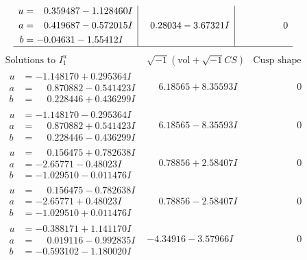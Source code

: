 \documentclass[1p]{elsarticle_modified}
\theoremstyle{definition}
\newcommand{\I}{\sqrt{-1}}
\begin{document}
$$\begin{array}{c|c|c}
\begin{aligned}
u &= \phantom{-}0.359487 - 1.128460 I \\
a &= \phantom{-}0.419687 - 0.572015 I \\
b &= -0.04631 - 1.55412 I\end{aligned}
 & \phantom{-}0.28034 - 3.67321 I & \phantom{-0.000000 } 0\\
 \hline 
 \end{array}$$\newpage$$\begin{array}{c|c|c}  
\text{Solutions to }I^u_{1}& \I (\text{vol} + \sqrt{-1}CS) & \text{Cusp shape}\\
 \hline 
\begin{aligned}
u &= -1.148170 + 0.295364 I \\
a &= \phantom{-}0.870882 - 0.541423 I \\
b &= \phantom{-}0.228446 + 0.436299 I\end{aligned}
 & \phantom{-}6.18565 + 8.35593 I & \phantom{-0.000000 } 0 \\ \hline\begin{aligned}
u &= -1.148170 - 0.295364 I \\
a &= \phantom{-}0.870882 + 0.541423 I \\
b &= \phantom{-}0.228446 - 0.436299 I\end{aligned}
 & \phantom{-}6.18565 - 8.35593 I & \phantom{-0.000000 } 0 \\ \hline\begin{aligned}
u &= \phantom{-}0.156475 + 0.782638 I \\
a &= -2.65771 - 0.48023 I \\
b &= -1.029510 - 0.011476 I\end{aligned}
 & \phantom{-}0.78856 + 2.58407 I & \phantom{-0.000000 } 0 \\ \hline\begin{aligned}
u &= \phantom{-}0.156475 - 0.782638 I \\
a &= -2.65771 + 0.48023 I \\
b &= -1.029510 + 0.011476 I\end{aligned}
 & \phantom{-}0.78856 - 2.58407 I & \phantom{-0.000000 } 0 \\ \hline\begin{aligned}
u &= -0.388171 + 1.141170 I \\
a &= \phantom{-}0.019116 - 0.992835 I \\
b &= -0.593102 - 1.180020 I\end{aligned}
 & -4.34916 - 3.57966 I & \phantom{-0.000000 } 0 \\ \hline\begin{aligned}

\end{aligned}
\end{array}$$
\end{document}
